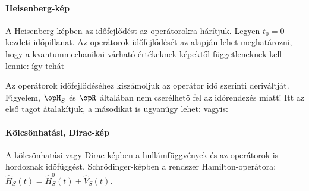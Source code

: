    \paragraph{Heisenberg-kép}
   
    A Heisenberg-képben az időfejlődést az operátorokra hárítjuk.
   Legyen $t_0=0$ kezdeti időpillanat.
   Az operátorok időfejlődését az alapján lehet meghatározni, hogy a kvantummechanikai várható értékeknek képektől függetleneknek kell lennie:
    így tehát
    
    Az operátorok időfejlődéséhez kiszámoljuk az operátor idő szerinti deriváltját.
   Figyelem, $\opH_S$ és $\opR$ általában nem cserélhető fel az időrendezés miatt!
    Itt az első tagot átalakítjuk, a másodikat is ugyanúgy lehet:
    vagyis:
   
   \paragraph{Kölcsönhatási, Dirac-kép}\label{ss:A01-dirac}
    A kölcsönhatási vagy Dirac-képben a hullámfüggvények és az operátorok is hordoznak időfüggést.
   Schrödinger-képben a rendszer Hamilton-operátora: $\hat{H}_S(t)=\hat{H}_S^0(t)+\hat{V}_S(t)$. 
   
